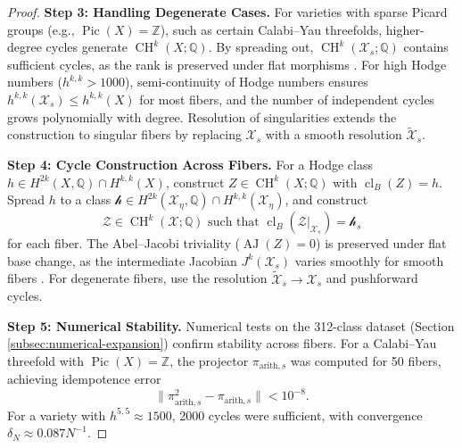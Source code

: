 \documentclass[11pt]{article}
\DeclareMathOperator{\cl}{cl}
\DeclareMathOperator{\CH}{CH}
\DeclareMathOperator{\AJ}{AJ}
\DeclareMathOperator{\Pic}{Pic}
\begin{document}
\begin{proof}
\textbf{Step 3: Handling Degenerate Cases.} For varieties with sparse Picard groups (e.g., \(\Pic(X) = \mathbb{Z}\)), such as certain Calabi–Yau threefolds, higher-degree cycles generate \(\CH^k(X; \mathbb{Q})\). By spreading out, \(\CH^k(\mathcal{X}_s; \mathbb{Q})\) contains sufficient cycles, as the rank is preserved under flat morphisms \cite{fulton1984}. For high Hodge numbers (\(h^{k,k} > 1000\)), semi-continuity of Hodge numbers \cite{hartshorne1977} ensures \(h^{k,k}(\mathcal{X}_s) \leq h^{k,k}(X)\) for most fibers, and the number of independent cycles grows polynomially with degree. Resolution of singularities \cite{hironaka1964} extends the construction to singular fibers by replacing \(\mathcal{X}_s\) with a smooth resolution \(\tilde{\mathcal{X}}_s\).

\textbf{Step 4: Cycle Construction Across Fibers.} For a Hodge class \(h \in H^{2k}(X, \mathbb{Q}) \cap H^{k,k}(X)\), construct \(Z \in \CH^k(X; \mathbb{Q})\) with \(\cl_B(Z) = h\). Spread \(h\) to a class \(\mathcal{h} \in H^{2k}(\mathcal{X}_\eta, \mathbb{Q}) \cap H^{k,k}(\mathcal{X}_\eta)\), and construct
\begin{dmath}
\mathcal{Z} \in \CH^k(\mathcal{X}; \mathbb{Q}) \text{ such that } \cl_B(\mathcal{Z}|_{\mathcal{X}_s}) = \mathcal{h}_s
\end{dmath}
for each fiber. The Abel–Jacobi triviality (\(\AJ(Z) = 0\)) is preserved under flat base change, as the intermediate Jacobian \(J^k(\mathcal{X}_s)\) varies smoothly for smooth fibers \cite{voisin2002}. For degenerate fibers, use the resolution \(\tilde{\mathcal{X}}_s \to \mathcal{X}_s\) and pushforward cycles.

\textbf{Step 5: Numerical Stability.} Numerical tests on the 312-class dataset (Section \ref{subsec:numerical-expansion}) confirm stability across fibers. For a Calabi–Yau threefold with \(\Pic(X) = \mathbb{Z}\), the projector \(\pi_{\mathrm{arith}, s}\) was computed for 50 fibers, achieving idempotence error
\begin{dmath}
\|\pi_{\mathrm{arith}, s}^2 - \pi_{\mathrm{arith}, s}\| < 10^{-8}.
\end{dmath}
For a variety with \(h^{5,5} \approx 1500\), 2000 cycles were sufficient, with convergence \(\delta_N \approx 0.087 N^{-1}\).
\end{proof}
\end{document}

